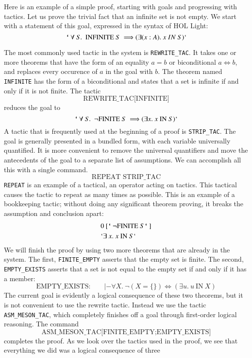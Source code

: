 \documentclass{llncs}
\def\bq{\text{\tt {`}\,}}
\begin{document}
Here is an example of a simple proof, starting with goals and
progressing with tactics.  Let us prove the trivial fact that an infinite set
is not empty.   We start with a statement of this goal, expressed in the syntax of HOL Light:
\[
\bq \forall~ S.~~ \text{INFINITE}~ S~ \Longrightarrow (\exists (x:A).~ x~IN~S)`
\]

The most commonly used tactic in the system is {\tt REWRITE\_TAC}.  It takes one or
more theorems that have the form of an equality $a=b$ or biconditional $a \Leftrightarrow b$, and replaces every occurence
of $a$ in the goal with $b$.  The theorem named {\tt INFINITE} has the form of
a biconditional and states that a set is infinite if and only if it is not finite.
The tactic
\[
\text{REWRITE\_TAC[INFINITE]}
\]
reduces the goal to
\[
\bq \forall~ S.~~ \lnot\text{FINITE}~ S~ \Longrightarrow (\exists x.~ x~\text{IN}~S)`
\]
A tactic that is frequently used at the beginning of a proof is {\tt STRIP\_TAC}.
The goal is generally presented in a bundled form, with each variable universally
quantified.  It is more convenient to remove the universal quantifiers and
move the antecedents of the goal to a separate list of assumptions.  We can
accomplish all this with a single command.
\[
\text{REPEAT STRIP\_TAC}
\]
{\tt REPEAT} is an example of a tactical, an operator acting on tactics.  This 
tactical causes the tactic to repeat as many times as possible. 
This is an example of a bookkeeping tactic;  without doing any significant theorem
proving, it breaks the assumption and conclusion apart:
\begin{align*}
  &0~[\bq\lnot\text{FINITE}~ S\bq]\\
  &`\exists~ x.~ x~ \text{IN}~ S`\\
\end{align*}
We will finish the proof by using two more theorems that are already in the system.
The first, {\tt FINITE\_EMPTY} asserts that the empty set is finite.  The second,
{\tt EMPTY\_EXISTS} asserts that a set is not equal to the empty set if and only if
it has a member:
\[
\text{EMPTY\_EXISTS:}\qquad |- \forall X.~\lnot(X = \{\}) \Leftrightarrow (\exists u.~u~\text{IN}~X)
\]
The current goal is evidently a logical consequence of these two theorems, but it is not convenient to use the rewrite tactic.  Instead we use the tactic {\tt ASM\_MESON\_TAC},
which completely finishes off a goal through first-order logical reasoning.  The command
\[
\text{ASM\_MESON\_TAC[FINITE\_EMPTY;EMPTY\_EXISTS]}
\]
completes the proof.  As we look over the tactics used in the proof,
we see that everything we did was a logical consequence of three
\end{document}
